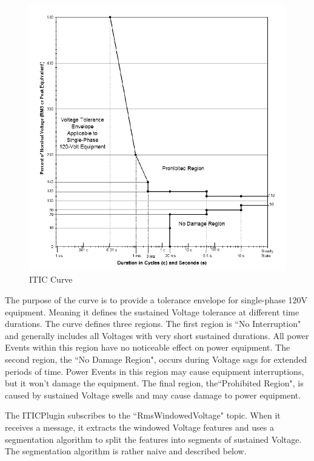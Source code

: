 \begin{figure}
	\centering
	\includegraphics[width=\linewidth]{figures/itic.png}
	\caption{ITIC Curve}
	\label{fig:IticCurve}
\end{figure}

The purpose of the curve is to provide a tolerance envelope for single-phase 120V equipment. Meaning it defines the sustained Voltage tolerance at different time durations. The curve defines three regions. The first region is ``No Interruption" and generally includes all Voltages with very short sustained durations. All power Events within this region have no noticeable effect on power equipment. The second region, the ``No Damage Region", occurs during Voltage sags for extended periods of time. Power Events in this region may cause equipment interruptions, but it won't damage the equipment. The final region, the``Prohibited Region", is caused by sustained Voltage swells and may cause damage to power equipment.

The ITICPlugin subscribes to the ``RmsWindowedVoltage" topic. When it receives a message, it extracts the windowed Voltage features and uses a segmentation algorithm to split the features into segments of sustained Voltage. The segmentation algorithm is rather naive and described below.

